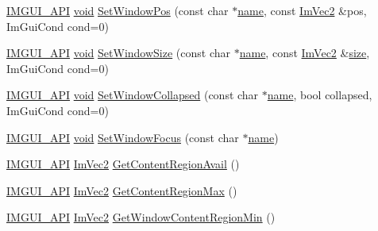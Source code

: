 \begin{DoxyCompactItemize}
\item 
\hyperlink{imgui_8h_a43829975e84e45d1149597467a14bbf5}{I\+M\+G\+U\+I\+\_\+\+A\+PI} \hyperlink{imgui__impl__opengl3__loader_8h_ac668e7cffd9e2e9cfee428b9b2f34fa7}{void} \hyperlink{namespaceImGui_a32032b56f975bb3145adbe19f38f3b56}{Set\+Window\+Pos} (const char $\ast$\hyperlink{imgui__impl__opengl3__loader_8h_a5c4947d4516dd7cfa3505ce3a648a4ef}{name}, const \hyperlink{structImVec2}{Im\+Vec2} \&pos, Im\+Gui\+Cond cond=0)
\item 
\hyperlink{imgui_8h_a43829975e84e45d1149597467a14bbf5}{I\+M\+G\+U\+I\+\_\+\+A\+PI} \hyperlink{imgui__impl__opengl3__loader_8h_ac668e7cffd9e2e9cfee428b9b2f34fa7}{void} \hyperlink{namespaceImGui_a441528b9198d4531e79337121212cd33}{Set\+Window\+Size} (const char $\ast$\hyperlink{imgui__impl__opengl3__loader_8h_a5c4947d4516dd7cfa3505ce3a648a4ef}{name}, const \hyperlink{structImVec2}{Im\+Vec2} \&\hyperlink{imgui__impl__opengl3__loader_8h_a3d1e3edfcf61ca2d831883e1afbad89e}{size}, Im\+Gui\+Cond cond=0)
\item 
\hyperlink{imgui_8h_a43829975e84e45d1149597467a14bbf5}{I\+M\+G\+U\+I\+\_\+\+A\+PI} \hyperlink{imgui__impl__opengl3__loader_8h_ac668e7cffd9e2e9cfee428b9b2f34fa7}{void} \hyperlink{namespaceImGui_ac349187d6aae141cd3b4476e54bcc338}{Set\+Window\+Collapsed} (const char $\ast$\hyperlink{imgui__impl__opengl3__loader_8h_a5c4947d4516dd7cfa3505ce3a648a4ef}{name}, bool collapsed, Im\+Gui\+Cond cond=0)
\item 
\hyperlink{imgui_8h_a43829975e84e45d1149597467a14bbf5}{I\+M\+G\+U\+I\+\_\+\+A\+PI} \hyperlink{imgui__impl__opengl3__loader_8h_ac668e7cffd9e2e9cfee428b9b2f34fa7}{void} \hyperlink{namespaceImGui_aa612adbb975051090898f094a1608f24}{Set\+Window\+Focus} (const char $\ast$\hyperlink{imgui__impl__opengl3__loader_8h_a5c4947d4516dd7cfa3505ce3a648a4ef}{name})
\item 
\hyperlink{imgui_8h_a43829975e84e45d1149597467a14bbf5}{I\+M\+G\+U\+I\+\_\+\+A\+PI} \hyperlink{structImVec2}{Im\+Vec2} \hyperlink{namespaceImGui_a410c8e19b2fea8b52746ca11b3930301}{Get\+Content\+Region\+Avail} ()
\item 
\hyperlink{imgui_8h_a43829975e84e45d1149597467a14bbf5}{I\+M\+G\+U\+I\+\_\+\+A\+PI} \hyperlink{structImVec2}{Im\+Vec2} \hyperlink{namespaceImGui_a0a4dbfabbfa45d74319ef541962ce2eb}{Get\+Content\+Region\+Max} ()
\item 
\hyperlink{imgui_8h_a43829975e84e45d1149597467a14bbf5}{I\+M\+G\+U\+I\+\_\+\+A\+PI} \hyperlink{structImVec2}{Im\+Vec2} \hyperlink{namespaceImGui_a790123aa15c266798f35050ba36b7197}{Get\+Window\+Content\+Region\+Min} ()

\end{DoxyCompactItemize}
